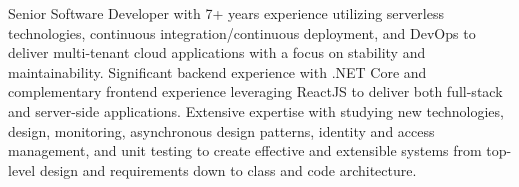\par{
    Senior Software Developer with 7+ years experience utilizing serverless technologies, continuous integration/continuous deployment, and DevOps to deliver multi-tenant cloud applications with a focus on stability and maintainability. Significant backend experience with .NET Core and complementary frontend experience leveraging ReactJS to deliver both full-stack and server-side applications. Extensive expertise with studying new technologies, design, monitoring, asynchronous design patterns, identity and access management, and unit testing to create effective and extensible systems from top-level design and requirements down to class and code architecture.
}